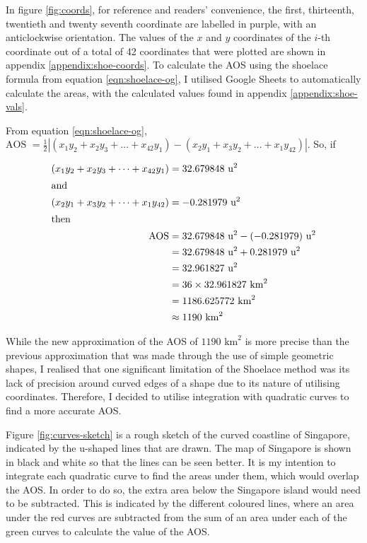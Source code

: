 \documentclass[12pt]{article}
\begin{document}
In figure \ref{fig:coords}, for reference and readers’ convenience, the first, thirteenth, twentieth and twenty seventh coordinate are labelled in purple, with an anticlockwise orientation. The values of the $x$ and $y$ coordinates of the $i$-th coordinate out of a total of 42 coordinates that were plotted are shown in appendix \ref{appendix:shoe-coords}. To calculate the AOS using the shoelace formula from equation \ref{eqn:shoelace-og}, I utilised Google Sheets to automatically calculate the areas, with the calculated values found in appendix \ref{appendix:shoe-vals}.\newline

From equation \ref{eqn:shoelace-og}, $\text{AOS }= \frac{1}{2}|(x_1y_2+x_2y_3+\dots+x_{42}y_1)-(x_2y_1+x_3y_2+\dots+x_1y_{42})|$. So, if

\vspace*{-8mm}
\bgroup
\singlespacing
\allowdisplaybreaks
\begin{align*}
(x_1y_2+x_2y_3+\dots+x_{42}y_1)&=32.679848\text{ u}^2\\
\intertext{and}
(x_2y_1+x_3y_2+\dots+x_1y_{42})&=-0.281979\text{ u}^2\\
\intertext{then} \text{AOS}
    &=32.679848\text{ u}^2-(-0.281979)\text{ u}^2\\
    &=32.679848\text{ u}^2+0.281979\text{ u}^2\\
    &=32.961827 \text{ u}^2\\
    &=36\times 32.961827 \text{ km}^2\\
    &=1186.625772 \text{ km}^2\\
    &\approx 1190 \text{ km}^2
\end{align*}
\egroup

While the new approximation of the AOS of $1190 \text{ km}^2$ is more precise than the previous approximation that was made through the use of simple geometric shapes, I realised that one significant limitation of the Shoelace method was its lack of precision around curved edges of a shape due to its nature of utilising coordinates. Therefore, I decided to utilise integration with quadratic curves to find a more accurate AOS.\newline

Figure \ref{fig:curves-sketch} is a rough sketch of the curved coastline of Singapore, indicated by the u-shaped lines that are drawn. The map of Singapore is shown in black and white so that the lines can be seen better. It is my intention to integrate each quadratic curve to find the areas under them, which would overlap the AOS. In order to do so, the extra area below the Singapore island would need to be subtracted. This is indicated by the different coloured lines, where an area under the red curves are subtracted from the sum of an area under each of the green curves to calculate the value of the AOS.
\end{document}
